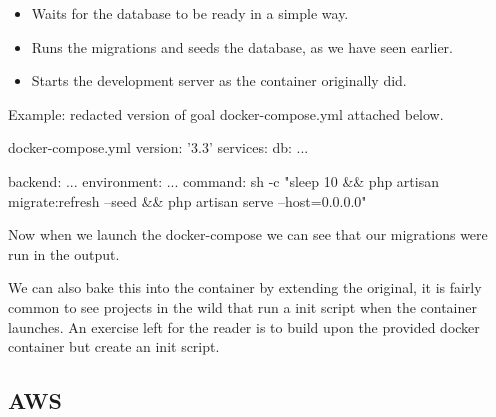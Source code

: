 \documentclass{csse4400}
\begin{document}
\begin{itemize}
  \item Waits for the database to be ready in a simple way.
  \item Runs the migrations and seeds the database, as we have seen earlier.
  \item Starts the development server as the container originally did.
\end{itemize}

Example: redacted version of goal docker-compose.yml attached below.

\begin{code}[language=docker-compose]{docker-compose.yml}
  version: '3.3'
  services:
    db:
      ...
  
    backend:
      ...
      environment:
        ...
      command: sh -c "sleep 10 && php artisan migrate:refresh --seed && php artisan serve --host=0.0.0.0"
\end{code}

Now when we launch the docker-compose we can see that our migrations were run in the output.


We can also bake this into the container by extending the original, it is fairly common to see projects
in the wild that run a init script when the container launches. An exercise left for the reader is to 
build upon the provided docker container but create an init script.

\subsection{AWS}




\end{document}
